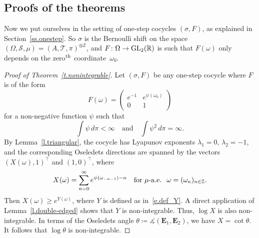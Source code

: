 \documentclass[10pt]{amsart}
\theoremstyle{definition}\newtheorem{defi}[theo]{Definition}\newtheorem{rema}[theo]{Remark}\newtheorem{exam}[theo]{Example}\newtheorem{exem}[theo]{Example}\newtheorem{nota}[theo]{Notation}
\newcommand{\Z}{\mathbb{Z}}
\newcommand{\R}{\mathbb{R}}
\newcommand{\E}{\mathbf{E}}
\newcommand{\clS}{\mathcal{S}}
\newcommand{\clT}{\mathcal{T}}
\DeclareMathOperator{\GL}{GL}
\renewcommand{\angle}{\measuredangle}
\renewcommand*{\to}{\mathchoice{\longrightarrow}{\rightarrow}{\rightarrow}{\rightarrow}}
\begin{document}
\subsection{Proofs of the theorems} \label{ss.iid_proofs}

Now we put ourselves in the setting of one-step cocycles $(\sigma,F)$, as explained in Section~\ref{ss.onestep}. So $\sigma$ is the Bernoulli shift on the space $(\Omega,\clS,\mu) = (A,\clT,\pi)^{\otimes \Z}$, and $F \colon \Omega \to \GL_2(\R)$ is such that $F(\omega)$ only depends on the zero$^{\rm th}$ coordinate~$\omega_0$.

\begin{proof}[Proof of Theorem~\ref{t.nonintegrable}]
Let $(\sigma,F)$ be any one-step cocycle where $F$ is of the form
\begin{equation}
F(\omega) =
\begin{pmatrix}
e^{-1} & e^{\psi(\omega_0)}\\
0 & 1
\end{pmatrix}
\end{equation}
for a non-negative function $\psi$ such that
\begin{equation}
\int \psi \, d\pi < \infty \quad \text{and} \quad
\int \psi^2 \, d\pi = \infty.
\end{equation}
By Lemma~\ref{l.triangular}, the cocycle has Lyapunov exponents $\lambda_1 = 0$, $\lambda_2 = -1$, and the corresponding Oseledets directions are spanned by the vectors $(X(\omega),1)^\top$ and $(1,0)^\top$, where
\begin{equation}
X(\omega) = \sum_{n=0}^\infty e^{\psi(\omega_{-n-1}) - n} \quad \text{for $\mu$-a.e.\; }\omega = (\omega_n)_{n \in \Z}.
\end{equation}
Then $X(\omega) \ge e^{Y(\omega)}$, where $Y$ is defined as in~\eqref{e.def_Y}. A direct application of Lemma~\ref{l.double-edged} shows that $Y$ is non-integrable. Thus, $\log X$ is also non-integrable. In terms of the Oseledets angle $\theta \coloneqq \angle(\E_1, \E_2)$, we have $X = \cot \theta$. It follows that $\log \theta$ is non-integrable.
\end{proof}
\end{document}
